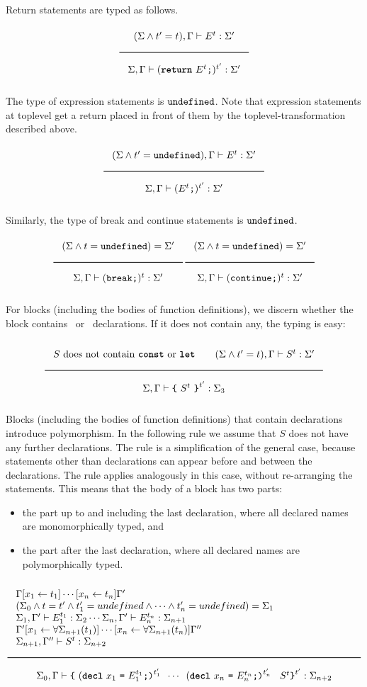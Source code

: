 \noindent
Return statements are typed as follows.
\[
\Rule{
(\Sigma \wedge t' = t), \Gamma \vdash E^{t} : \Sigma' }{
\Sigma, \Gamma \vdash (\Return\ E^{t} \texttt{;})^{t'} : \Sigma'}
\]

\noindent
The type of expression statements is $\texttt{undefined}$. Note that expression statements
at toplevel get a return placed in front of them by the toplevel-transformation described above.
\[
\Rule{
(\Sigma \wedge t' = \Undefined), \Gamma \vdash E^{t} : \Sigma' }{
\Sigma, \Gamma \vdash (E^{t} \texttt{;})^{t'} : \Sigma'}
\]

\noindent
Similarly, the type of break and continue statements is $\texttt{undefined}$.
\[
\Rule{
(\Sigma \wedge t = \Undefined) = \Sigma' }{
\Sigma, \Gamma \vdash (\texttt{break} \texttt{;})^{t} : \Sigma'}
\hfill
\Rule{
(\Sigma \wedge t = \Undefined) = \Sigma' }{
\Sigma, \Gamma \vdash (\texttt{continue} \texttt{;})^{t} : \Sigma'}
\]

\noindent
For blocks (including the bodies of function definitions), we discern whether the
block contains \Const \ or \Let \ declarations. If it does not contain any, the typing is easy:

\[
\Rule{
  S\ \textrm{does not contain }\Const \textrm{ or } \Let \qquad
  (\Sigma \wedge t' = t), \Gamma \vdash S^{t} : \Sigma' }{
\Sigma, \Gamma \vdash \Lc \ S^{t} \ \Rc^{t'}  : \Sigma_3}
\]

\noindent
Blocks (including the bodies of function definitions) that 
contain declarations introduce polymorphism. In the following
rule we assume that $S$ does not have any further declarations. The rule
is a simplification of the general case, because statements other than
declarations can appear before and between the declarations. The rule
applies analogously in this case, without re-arranging the statements. This means
that the body of a block has two parts:
\begin{itemize}
\item the part up to and including the last declaration, where all
  declared names are monomorphically typed, and
\item the part after the last declaration, where all declared names
  are polymorphically typed.
\end{itemize}

\[
\Rule{
  \begin{minipage}{120mm}
    $\Gamma[x_1 \leftarrow t_1]\cdots[x_n \leftarrow t_n]\Gamma' $\\
    $(\Sigma_0 \wedge t = t' \wedge t'_1 = undefined \wedge \cdots \wedge t'_n = undefined) = \Sigma_1$ \\
    $\Sigma_1, \Gamma' \vdash E_1^{t_1} : \Sigma_2 \cdots
     \Sigma_n, \Gamma' \vdash E_n^{t_n} : \Sigma_{n+1}$\\
    $\Gamma'[x_1 \leftarrow \forall \Sigma_{n+1}(t_1)]\cdots[x_n \leftarrow \forall \Sigma_{n+1}(t_n)]\Gamma'' $\\
    $\Sigma_{n+1}, \Gamma'' \vdash S^t : \Sigma_{n+2}$
  \end{minipage}
}{
  \Sigma_0, \Gamma \vdash \Lc\
  (\textbf{\texttt{decl}}\ x_1 \ \texttt{=}\ E_1^{t_1} \texttt{;)}^{t'_1} \texttt{ } \cdots \texttt{ }
  (\textbf{\texttt{decl}}\ x_n \ \texttt{=}\ E_n^{t_n} \texttt{;)}^{t'_n} \texttt{ } \ S^t \Rc^{t'} : \Sigma_{n+2}
}
\]

